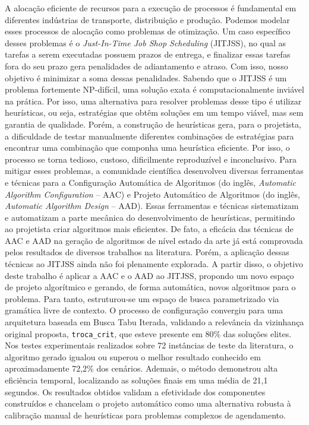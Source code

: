 A alocação eficiente de recursos para a execução de processos é fundamental em diferentes indústrias de transporte, distribuição e produção. Podemos modelar esses processos de alocação como problemas de otimização. Um caso específico desses problemas é o \textit{Just-In-Time Job Shop Scheduling} (JITJSS), no qual as tarefas a serem executadas possuem prazos de entrega, e finalizar essas tarefas fora do seu prazo gera penalidades de adiantamento e atraso. Com isso, nosso objetivo é minimizar a soma dessas penalidades. Sabendo que o JITJSS é um problema fortemente NP-difícil, uma solução exata é computacionalmente inviável na prática. Por isso, uma alternativa para resolver problemas desse tipo é utilizar heurísticas, ou seja, estratégias que obtêm soluções em um tempo viável, mas sem garantia de qualidade. Porém, a construção de heurísticas gera, para o projetista, a dificuldade de testar manualmente diferentes combinações de estratégias para encontrar uma combinação que componha uma heurística eficiente. Por isso, o processo se torna tedioso, custoso, dificilmente reproduzível e inconclusivo. Para mitigar esses problemas, a comunidade científica desenvolveu diversas ferramentas e técnicas para a Configuração Automática de Algoritmos (do inglês, \textit{Automatic Algorithm Configuration} -- AAC) e Projeto Automático de Algoritmos (do inglês, \textit{Automatic Algorithm Design} -- AAD). Essas ferramentas e técnicas sistematizam e automatizam a parte mecânica do desenvolvimento de heurísticas, permitindo ao projetista criar algoritmos mais eficientes. De fato, a eficácia das técnicas de AAC e AAD na geração de algoritmos de nível estado da arte já está comprovada pelos resultados de diversos trabalhos na literatura. Porém, a aplicação dessas técnicas ao JITJSS ainda não foi plenamente explorada. A partir disso, o objetivo deste trabalho é aplicar a AAC e o AAD ao JITJSS, propondo um novo espaço de projeto algorítmico e gerando, de forma automática, novos algoritmos para o problema. Para tanto, estruturou-se um espaço de busca parametrizado via gramática livre de contexto. O processo de configuração convergiu para uma arquitetura baseada em Busca Tabu Iterada, validando a relevância da vizinhança original proposta, \texttt{troca\_crit}, que esteve presente em 80\% das soluções elites. Nos testes experimentais realizados sobre 72 instâncias de teste da literatura, o algoritmo gerado igualou ou superou o melhor resultado conhecido em aproximadamente 72,2\% dos cenários. Ademais, o método demonstrou alta eficiência temporal, localizando as soluções finais em uma média de 21,1 segundos. Os resultados obtidos validam a efetividade dos componentes construídos e chancelam o projeto automático como uma alternativa robusta à calibração manual de heurísticas para problemas complexos de agendamento.

